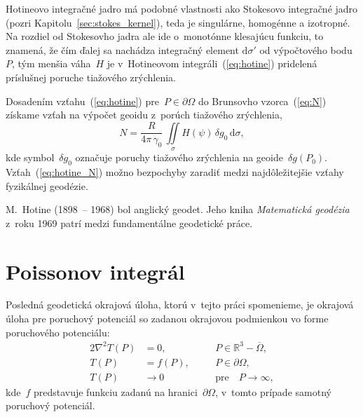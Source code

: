 \documentclass[a4paper, 12pt]{book}
\newcommand{\diff}{\mathrm d}
\begin{document}
Hotineovo integračné jadro má podobné vlastnosti ako Stokesovo integračné jadro 
(pozri Kapitolu~\ref{sec:stokes_kernel}), teda je singulárne, homogénne 
a izotropné.  Na rozdiel od Stokesovho jadra ale ide o~monotónne klesajúcu 
funkciu, to znamená, že čím ďalej sa nachádza integračný element $\diff\sigma'$ 
od výpočtového bodu~$P$, tým menšia váha~$H$ je v~Hotineovom 
integráli~(\ref{eq:hotine}) pridelená príslušnej poruche tiažového zrýchlenia.

Dosadením vzťahu~(\ref{eq:hotine}) pre~$P \in \partial\Omega$ do Brunsovho 
vzorca~(\ref{eq:N}) získame vzťah na výpočet geoidu z~porúch tiažového 
zrýchlenia,
%
\begin{equation}
\label{eq:hotine_N}
N = \frac{R}{4\pi \, \gamma_0} \, \iint\limits_{\sigma} H(\psi) \, \delta g_0 
\, \diff \sigma{,}
\end{equation}
%
kde symbol~$\delta g_0$ označuje poruchy tiažového zrýchlenia na geoide~$\delta 
g(P_0)$.  Vzťah~(\ref{eq:hotine_N}) možno bezpochyby zaradiť medzi 
najdôležitejšie vzťahy fyzikálnej geodézie.

M.~Hotine (1898~-- 1968) bol anglický geodet.  Jeho kniha \textit{Matematická 
geodézia} z~roku 1969 patrí medzi fundamentálne geodetické práce.

\section{Poissonov integrál}
\label{sec:poisson_integral}

Posledná geodetická okrajová úloha, ktorú v~tejto práci spomenieme, je okrajová 
úloha pre poruchový potenciál so zadanou okrajovou podmienkou vo forme 
poruchového potenciálu:
%
\begin{alignat}{2}
\nabla^2 T(P) &= 0{,} &&P \in \mathbb{R}^3 
- \overline\Omega{,}\label{eq:bvp_t_laplace}\\
T(P) &= f(P){,} \quad &&P \in 
\partial\Omega{,}\label{eq:bvp_t_boundary_condition}\\
T(P) &\rightarrow 0 &&\textrm{pre} \quad P \rightarrow 
\infty{,}\label{eq:bvp_t_t_infty}
\end{alignat}
%
kde~$f$ predstavuje funkciu zadanú na hranici~$\partial\Omega$, v~tomto prípade 
samotný poruchový potenciál.
\end{document}
